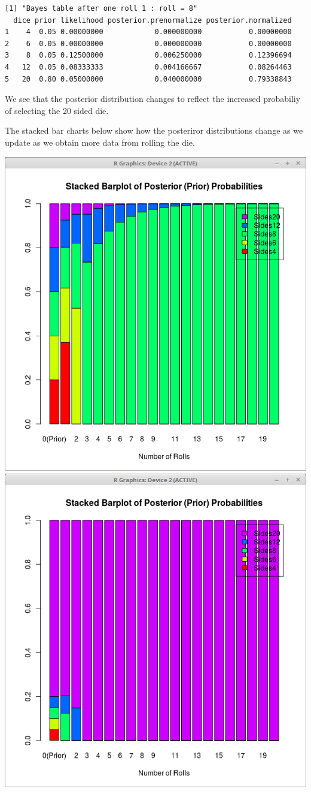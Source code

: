 \documentclass[a5paper,11pt]{article}
\begin{document}
\begin{lstlisting}
[1] "Bayes table after one roll 1 : roll = 8"
  dice prior likelihood posterior.prenormalize posterior.normalized
1    4  0.05 0.00000000            0.000000000           0.00000000
2    6  0.05 0.00000000            0.000000000           0.00000000
3    8  0.05 0.12500000            0.006250000           0.12396694
4   12  0.05 0.08333333            0.004166667           0.08264463
5   20  0.80 0.05000000            0.040000000           0.79338843
\end{lstlisting}

We see that the posterior distribution changes to reflect the increased
probabiliy of selecting the 20 sided die.

The stacked bar charts below show how the posteriror distributions change
as we update as we obtain more data from rolling the die.

\includegraphics[scale=0.5]{uniform-dist.png}
\includegraphics[scale=0.5]{skewed-dist.png}



\printbibliography{}
\end{document}
